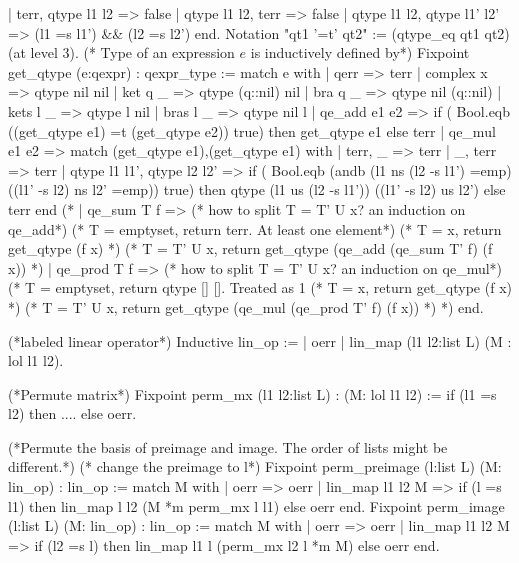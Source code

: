 \begin{coq}
    | terr, qtype l1 l2 => false
    | qtype l1 l2, terr => false
    | qtype l1 l2, qtype l1' l2' => (l1 =s l1') && (l2 =s l2')
    end.
Notation "qt1 '=t' qt2" := (qtype_eq qt1 qt2) (at level 3).
(* Type of an expression $e$ is inductively defined by*)
Fixpoint get_qtype (e:qexpr) : qexpr_type :=
    match e with
    | qerr => terr
    | complex x => qtype nil nil
    | ket q _ => qtype (q::nil) nil
    | bra q _ => qtype nil (q::nil)
    | kets l _ => qtype l nil
    | bras l _ => qtype nil l
    | qe_add e1 e2 => if ( Bool.eqb ((get_qtype e1) =t (get_qtype e2)) true) then
                          get_qtype e1 else terr
    | qe_mul e1 e2 => match (get_qtype e1),(get_qtype e1) with
                          | terr, _ => terr
                          | _, terr => terr
                          | qtype l1 l1', qtype l2 l2' =>
                                if ( Bool.eqb (andb (l1 ns (l2 -s l1') =emp) ((l1' -s l2) ns l2' =emp)) true) then
                                qtype (l1 us (l2 -s l1')) ((l1' -s l2) us l2')
                                else terr
                          end
(*     | qe_sum T f => (* how to split T = T' U {x}? an induction on qe_add*)
                        (* T = emptyset, return terr. At least one element*)
                        (* T = {x}, return get_qtype (f x) *)
                        (* T = T' U {x}, return get_qtype (qe_add (qe_sum T' f) (f x)) *)
    | qe_prod T f => (* how to split T = T' U {x}? an induction on qe_mul*)
                        (* T = emptyset, return qtype [] []. Treated as 1%
                        (* T = {x}, return get_qtype (f x) *)
                        (* T = T' U {x}, return get_qtype (qe_mul (qe_prod T' f) (f x)) *) *)
    end.
   
(*labeled linear operator*)     
Inductive lin_op :=
    | oerr
    | lin_map (l1 l2:list L) (M : lol l1 l2). 

(*Permute matrix*)
Fixpoint perm_mx (l1 l2:list L) : (M: lol l1 l2) :=
    if (l1 =s l2) then ....
    else oerr.

(*Permute the basis of preimage and image. The order of lists might be different.*)
(* change the preimage to l*)
Fixpoint perm_preimage (l:list L) (M: lin_op) : lin_op := 
    match M with
    | oerr => oerr
    | lin_map l1 l2 M => if (l =s l1) then 
                                lin_map l l2 (M *m perm_mx l l1)
                         else oerr
    end.
Fixpoint perm_image (l:list L) (M: lin_op) : lin_op := 
    match M with 
    | oerr => oerr
    | lin_map l1 l2 M => if (l2 =s l) then 
                                lin_map l1 l (perm_mx l2 l *m M)
                         else oerr
    end.
    
    


    \end{coq}
    
